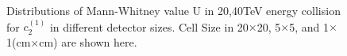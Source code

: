 \documentclass[final,1p,11pt]{elsarticle}
\begin{document}
\begin{figure}
\begin{center}
{   }

\end{center}
\caption{Distributions of Mann-Whitney value U in 20,40TeV energy collision for $c_2^{(1)}$ in different detector sizes. Cell Size in 20$\times$20, 5$\times$5, and 1$\times$1(cm$\times$cm) are shown here.}
\label{fig:cluster_tau21_tau32}
\end{figure}
\end{document}
